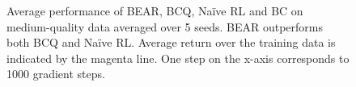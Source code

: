 \begin{figure}
\begin{subfigure}[t]{0.23\textwidth}
    \end{subfigure}
    \caption{\label{fig:mediocre} \footnotesize Average performance of BEAR, BCQ, Na\"ive RL and BC on medium-quality data averaged over 5 seeds. BEAR outperforms both BCQ and Na\"ive RL. Average return over the training data is indicated by the magenta line. One step on the x-axis corresponds to 1000 gradient steps.}
\end{figure}


